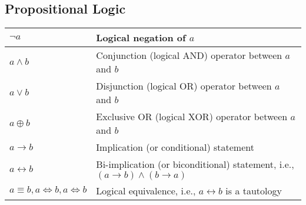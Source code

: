 \documentclass{article}
\begin{document}
\subsection{Propositional Logic}
\begin{xltabular}{\textwidth}{XX}
	\(\lnot a\)                                    & Logical negation of \(a\) \cite{rosenDiscreteMathematicsIts2011}                                                                                       \\ \hline
	\(a \wedge b\)                                 & Conjunction (logical AND) operator between \(a\) and \(b\)\cite{rosenDiscreteMathematicsIts2011}                                                       \\ \hline
	\(a \vee b\)                                   & Disjunction (logical OR) operator between \(a\) and \(b\)\cite{rosenDiscreteMathematicsIts2011}                                                        \\ \hline
	\(a \oplus b\)                                 & Exclusive OR (logical XOR) operator between \(a\) and \(b\)\cite{rosenDiscreteMathematicsIts2011}                                                      \\ \hline
	\(a \rightarrow b\)                            & Implication (or conditional) statement\cite{rosenDiscreteMathematicsIts2011}                                                                           \\ \hline
	\(a \leftrightarrow b\)                        & Bi-implication (or biconditional) statement, i.e., \(\left( a \rightarrow b \right) \wedge (b \rightarrow a )\) \cite{rosenDiscreteMathematicsIts2011} \\ \hline
	\(a \equiv b, a \iff b, a \Leftrightarrow b \) & Logical equivalence, i.e., \(a \leftrightarrow b\) is a tautology\cite{rosenDiscreteMathematicsIts2011}                                                \\
\end{xltabular}
\end{document}
